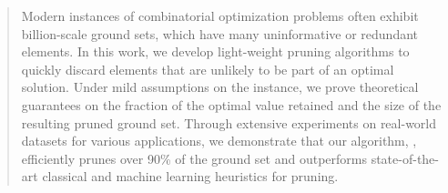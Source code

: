 \begin{abstract}
  Modern instances of combinatorial optimization problems
  often exhibit billion-scale ground sets, which have many
  uninformative or redundant elements. In this work, we
  develop light-weight pruning algorithms to quickly
  discard elements that are unlikely to be part of an
  optimal solution. Under mild assumptions on the instance,
  we prove theoretical guarantees on the fraction of the
  optimal value retained and the size of the resulting
  pruned ground set. 
  Through extensive experiments on real-world datasets for various applications, we demonstrate that our algorithm, \qs{},
  efficiently prunes over 90\% of the ground set
  and outperforms state-of-the-art classical and
  machine learning heuristics for pruning. %


\end{abstract}

